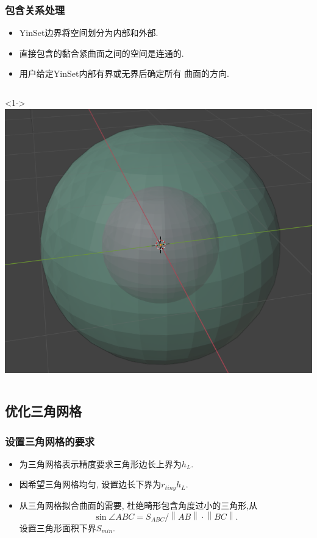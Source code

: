 \documentclass[UTF8]{ctexbeamer}	%
\theoremstyle{plain}
\theoremstyle{definition}
\theoremstyle{remark}
\numberwithin{equation}{section}
\begin{document}
\begin{frame}
    \frametitle{包含关系处理}
    \begin{itemize}
        \item YinSet边界将空间划分为内部和外部.

        \item 直接包含的黏合紧曲面之间的空间是连通的.
        
        \item 用户给定YinSet内部有界或无界后确定所有
        曲面的方向.
    \end{itemize}
    \begin{columns}
        <1->
        \centering
        \includegraphics[width = .8\textwidth]{fig/faceContain.png}
    \end{columns}
\end{frame}

\subsection{优化三角网格}
\begin{frame}
    \frametitle{设置三角网格的要求}
    \begin{itemize}
        \item 为三角网格表示精度要求三角形边长上界为$h_L$.
        \item 因希望三角网格均匀, 设置边长下界为$r_{tiny}h_L$.
        \item 从三角网格拟合曲面的需要, 杜绝畸形包含角度过小的三角形,从
        \[ \sin \angle ABC =  S_{ABC} / \left\| AB \right\| \cdot \left\| BC \right\|. \]
        设置三角形面积下界$S_{min}$.
        
    \end{itemize}
\end{frame}
\end{document}
